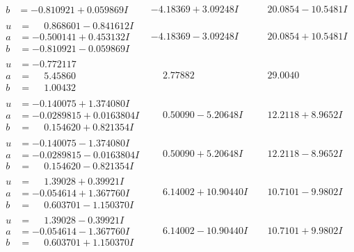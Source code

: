 \documentclass[1p]{elsarticle_modified}
\theoremstyle{definition}
\begin{document}
$$\begin{array}{c|c|c}
\begin{aligned}
b &= -0.810921 + 0.059869 I\end{aligned}
 & -4.18369 + 3.09248 I & \phantom{-}20.0854 - 10.5481 I \\ \hline\begin{aligned}
u &= \phantom{-}0.868601 - 0.841612 I \\
a &= -0.500141 + 0.453132 I \\
b &= -0.810921 - 0.059869 I\end{aligned}
 & -4.18369 - 3.09248 I & \phantom{-}20.0854 + 10.5481 I \\ \hline\begin{aligned}
u &= -0.772117\phantom{ +0.000000I} \\
a &= \phantom{-}5.45860\phantom{ +0.000000I} \\
b &= \phantom{-}1.00432\phantom{ +0.000000I}\end{aligned}
 & \phantom{-}2.77882\phantom{ +0.000000I} & \phantom{-}29.0040\phantom{ +0.000000I} \\ \hline\begin{aligned}
u &= -0.140075 + 1.374080 I \\
a &= -0.0289815 + 0.0163804 I \\
b &= \phantom{-}0.154620 + 0.821354 I\end{aligned}
 & \phantom{-}0.50090 - 5.20648 I & \phantom{-}12.2118 + 8.9652 I \\ \hline\begin{aligned}
u &= -0.140075 - 1.374080 I \\
a &= -0.0289815 - 0.0163804 I \\
b &= \phantom{-}0.154620 - 0.821354 I\end{aligned}
 & \phantom{-}0.50090 + 5.20648 I & \phantom{-}12.2118 - 8.9652 I \\ \hline\begin{aligned}
u &= \phantom{-}1.39028 + 0.39921 I \\
a &= -0.054614 + 1.367760 I \\
b &= \phantom{-}0.603701 - 1.150370 I\end{aligned}
 & \phantom{-}6.14002 + 10.90440 I & \phantom{-}10.7101 - 9.9802 I \\ \hline\begin{aligned}
u &= \phantom{-}1.39028 - 0.39921 I \\
a &= -0.054614 - 1.367760 I \\
b &= \phantom{-}0.603701 + 1.150370 I\end{aligned}
 & \phantom{-}6.14002 - 10.90440 I & \phantom{-}10.7101 + 9.9802 I \\ \hline\begin{aligned}

\end{aligned}
\end{array}$$
\end{document}
